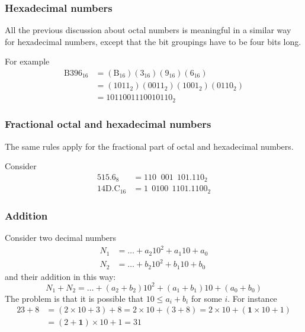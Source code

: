 % 
\begin{frame}
\frametitle{Hexadecimal numbers}

All the previous discussion about octal numbers is meaningful in a
similar way for hexadecimal numbers, except that the bit groupings
have to be four bits long.

\bigskip

For example
\begin{align*}
\text{B}396_{16} &= (\text{B}_{16})(3_{16})(9_{16})(6_{16})\\
                 &= (1011_2)(0011_2)(1001_2)(0110_2)\\
                 &= 1011001110010110_2
\end{align*}

\end{frame}

% 
\begin{frame}
\frametitle{Fractional octal and hexadecimal numbers}

The same rules apply for the fractional part of octal and hexadecimal
numbers.

\bigskip

Consider
\begin{align*}
515.6_8 &= 110\;\; 001\;\, 101.110_2\\
14\text{D}.\text{C}_{16} &= 1\;\, 0100\;\, 1101.1100_2
\end{align*}

\end{frame}

% 
\begin{frame}
\frametitle{Addition}

Consider two decimal numbers
\begin{align*}
N_1 &= \dots + a_2 10^2 + a_1 10 + a_0\\
N_2 &= \dots + b_2 10^2 + b_1 10 + b_0
\end{align*}
and their addition in this way:
\[
N_1 + N_2 = \dots + (a_2 + b_2) 10^2 + (a_1 + b_1) 10 + (a_0 + b_0)
\]
The problem is that it is possible that \(10 \leqslant a_i + b_i\) for
some \(i\). For instance
\begin{align*}
23 + 8 &= (2 \times 10 + 3) + 8 = 2 \times 10 + (3 + 8) = 2
\times 10 + (\mathbf{1} \times 10 + 1)\\
 &= (2 + \mathbf{1}) \times 10 + 1 = 31
\end{align*}

\end{frame}

